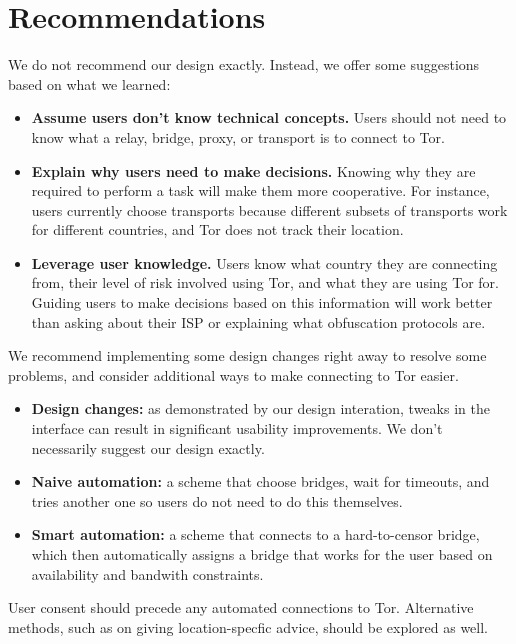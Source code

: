 \documentclass[USenglish,oneside,twocolumn]{article}
\begin{document}
\section{Recommendations}
\label{sec:recommendations}
We do not recommend our design exactly. Instead, we offer some suggestions based on what we learned: \\
 
\begin{itemize}
\item {\bfseries Assume users don't know technical concepts.} Users should not need to know what a relay, bridge, proxy, or transport is to connect to Tor. 
\item {\bfseries Explain why users need to make decisions.} Knowing why they are required to perform a task will make them more cooperative. For instance, users currently choose transports because different subsets of transports work for different countries, and Tor does not track their location.  
\item {\bfseries Leverage user knowledge.} Users know what country they are connecting from, their level of risk involved using Tor, and what they are using Tor for. Guiding users to make decisions based on this information will work better than asking about their ISP or explaining what obfuscation protocols are. 
\end{itemize}

We recommend implementing some design changes right away to resolve some problems, and consider additional ways to make connecting to Tor easier. \\

\begin{itemize}
\item{\bfseries Design changes:} as demonstrated by our design interation, tweaks in the interface can result in significant usability improvements. We don't necessarily suggest our design exactly. 
\item{\bfseries Naive automation:} a scheme that choose bridges, wait for timeouts, and tries another one so users do not need to do this themselves. 
\item{\bfseries Smart automation:} a scheme that connects to a hard-to-censor bridge, which then automatically assigns a bridge that works for the user based on availability and bandwith constraints. 
\end{itemize}

User consent should precede any automated connections to Tor. Alternative methods, such as on giving location-specfic advice, should be explored as well. 
\end{document}

